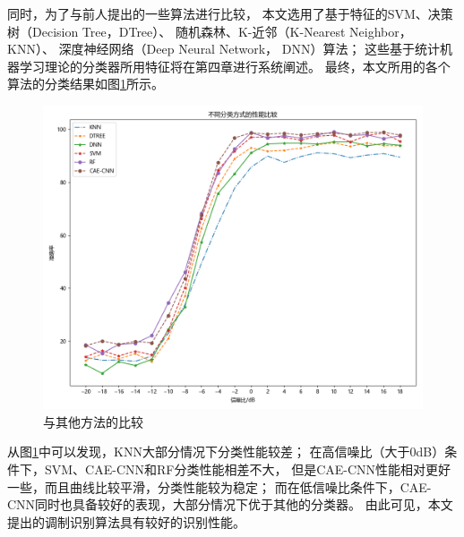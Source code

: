 同时，为了与前人提出的一些算法进行比较，
本文选用了基于特征的SVM、决策树（Decision Tree，DTree）、
随机森林、K-近邻（K-Nearest Neighbor，KNN）、
深度神经网络（Deep Neural Network， DNN）算法；
这些基于统计机器学习理论的分类器所用特征将在第四章进行系统阐述。
最终，本文所用的各个算法的分类结果如图\ref{sec:fig_3_11}所示。\par

\begin{figure}[!h]
	\centering
	\includegraphics[scale=0.5]{figures/chapter_3/fig_3_11}
	\caption{与其他方法的比较}	\label{sec:fig_3_11}
\end{figure}

从图\ref{sec:fig_3_11}中可以发现，KNN大部分情况下分类性能较差；
在高信噪比（大于0dB）条件下，SVM、CAE-CNN和RF分类性能相差不大，
但是CAE-CNN性能相对更好一些，而且曲线比较平滑，分类性能较为稳定；
而在低信噪比条件下，CAE-CNN同时也具备较好的表现，大部分情况下优于其他的分类器。
由此可见，本文提出的调制识别算法具有较好的识别性能。\par

